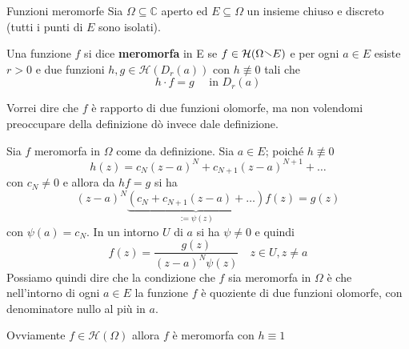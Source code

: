 \begin{definition}{Funzioni meromorfe}
    Sia \(\Omega \subseteq  \mathbb{C}\) aperto ed \(E \subseteq  \Omega\) un
    insieme chiuso e discreto (tutti i punti di \(E\) sono isolati).

    Una funzione \(f\) si dice \textbf{meromorfa} in E se \(f \in
    \mathcal{H}{(\Omega \sminus  E)}\) e per ogni \(a \in E\) esiste \(r > 0\) e
    due funzioni \(h, g \in \mathcal{H}{(D_r{(a)})}\) con \(h \not\equiv 0\)
    tali che 
    \[
        h \cdot f = g \quad \text{ in } D_r{(a)}
    \]
\end{definition}
\begin{remark}
    Vorrei dire che \(f\) è rapporto di due funzioni olomorfe, ma non volendomi
    preoccupare della definizione dò invece dale definizione.
\end{remark}
Sia \(f\) meromorfa in \(\Omega\) come da definizione. Sia \(a \in E\); poiché
\(h \not\equiv 0\) 
\[
    h{(z)} = c_N{(z-a)}^{N} + c_{N+1}{(z-a)}^{N+1} + \dots
\]
con \(c_N \neq 0\) e allora da \(hf = g\) si ha
\[
    {(z-a)}^{N}\underbrace{(c_N + c_{N+1}{(z-a)} + \dots)}_{:= \psi {(z)}}
    f{(z)} = g{(z)}
\]
con \(\psi {(a)} = c_N\). In un intorno \(U\) di \(a\) si ha \(\psi \neq 0\) e
quindi
\begin{equation}\label{eq:meromorfa}
    f{(z)} = \frac{g{(z)}}{{(z-a)}^{N}\psi {(z)}} \quad z \in U, z \neq a
\end{equation}
Possiamo quindi dire che la condizione che \(f\) sia meromorfa in \(\Omega\) è
che nell'intorno di ogni \(a \in E\) la funzione \(f\) è quoziente di due
funzioni olomorfe, con denominatore nullo al più in \(a\).
\begin{remark}
    Ovviamente \(f \in \mathcal{H}{(\Omega)}\) allora \(f\) è meromorfa con \(h
    \equiv 1\) 
\end{remark}

